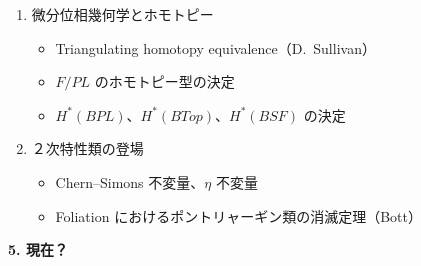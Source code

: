 \documentclass[uplatex,dvipdfmx]{jlreq}
\begin{document}
\begin{enumerate}
\begin{itemize}
          \item Novikov のスペクトル列
          \item 局所化（Brown--Peterson スペクトラム）
          \item １次元 formal 群の普遍性（Quillen）
          \item 複素コボルディズム理論と $K$-理論、Morava の $K$-theory
        \end{itemize}
  \item 微分位相幾何学とホモトピー
        \begin{itemize}
          \item Triangulating homotopy equivalence（D.~Sullivan）
          \item $F/PL$ のホモトピー型の決定
          \item $H^*(BPL)$、$H^*(BTop)$、$H^*(BSF)$ の決定
        \end{itemize}
  \item ２次特性類の登場
        \begin{itemize}
          \item Chern--Simons 不変量、$\eta$ 不変量
          \item Foliation におけるポントリャーギン類の消滅定理（Bott）
        \end{itemize}
\end{enumerate}

\medskip
\noindent\textbf{5. 現在？}
\end{document}
